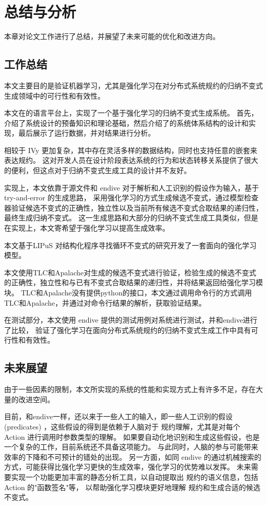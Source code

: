 \chapter{总结与分析}\label{chap:conclusion}
本章对论文工作进行了总结，并展望了未来可能的优化和改进方向。
\section{工作总结}
本文主要目的是验证机器学习，尤其是强化学习在对分布式系统规约的归纳不变式生成领域中的可行性和有效性。

本文在\TLA 的语言平台上，实现了一个基于强化学习的归纳不变式生成系统。
首先，介绍了系统设计的预备知识和理论基础，然后介绍了\rltla 的系统体系结构的设计和实现，最后展示了运行数据，并对结果进行分析。

\TLA 相较于 IVy 更加复杂，其中存在灵活多样的数据结构，同时也支持任意的嵌套来表达规约。
这对开发人员在设计阶段表达系统的行为和状态转移关系提供了很大的便利，但这点对于归纳不变式生成工具的设计并不友好。

实现上，本文依靠于\TLA 源文件和 endive 对于\TLA 解析和人工识别的假设作为输入，基于 try-and-error 的生成思路，
采用强化学习的方式生成候选不变式，通过模型检查器验证候选不变式的正确性，独立性以及当前所有候选不变式合取结果的递归性，最终生成归纳不变式。
这一生成思路和大部分的归纳不变式生成工具类似，但是在实现上，本文寄希望于强化学习以提高生成效率。

本文基于LIPuS \cite{LIPuS} 对结构化程序寻找循环不变式的研究开发了一套面向\TLA 的强化学习模型。

本文使用TLC和Apalache对生成的候选不变式进行验证，检验生成的候选不变式的正确性，独立性和与已有不变式合取结果的递归性，并将结果返回给强化学习模块。
TLC和Apalache没有提供python的接口，本文通过调用命令行的方式调用TLC和Apalache，并通过对命令行结果的解析，获取验证结果。

在测试部分，本文使用 endive 提供的测试用例对系统进行测试，并和endive进行了比较，
验证了强化学习在面向分布式系统规约的归纳不变式生成工作中具有可行性和有效性。

\section{未来展望}
由于一些因素的限制，本文所实现的系统的性能和实现方式上有许多不足，存在大量的改进空间。

目前，和endive一样，\rltla 还以来于一些人工的输入，即一些人工识别的假设(predicates)
，这些假设的得到是依赖于人脑对于 \TLA 规约理解，尤其是对每个 Action 进行调用时参数类型的理解。
如果要自动化地识别和生成这些假设，也是一个复杂的工作，目前系统还不具备这项能力。
与此同时，人脑的参与可能带来效率的下降和不可预计的错处的出现。
另一方面，如同 endive 的通过机械搜索的方式，可能获得比强化学习更快的生成效率，强化学习的优势难以发挥。
未来需要实现一个功能更加丰富的静态分析工具，以自动提取出 \TLA 规约的语义信息，包括 Action 的"函数签名"等，
以帮助强化学习模块更好地理解 \TLA 规约和生成合适的候选不变式。

